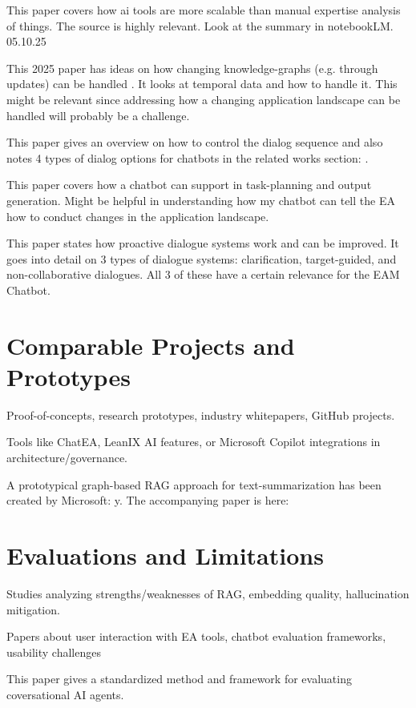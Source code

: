This paper covers how ai tools are more scalable than manual expertise analysis of things. The source is highly relevant. Look at the summary in notebookLM. 05.10.25 \cite{gu2024survey}

This 2025 paper has ideas on how changing knowledge-graphs (e.g. through updates) can be handled \cite{temporalGraphRag}. It looks at temporal data and how to handle it. This might be relevant since addressing how a changing application landscape can be handled will probably be a challenge.

This paper gives an overview on how to control the dialog sequence and also notes 4 types of dialog options for chatbots in the related works section: \cite{li2025chatsopsopguidedmctsplanning}.

This paper \cite{Zhai_2025} covers how a chatbot can support in task-planning and output generation. Might be helpful in understanding how my chatbot can tell the EA how to conduct changes in the application landscape.

This paper \cite{deng2023promptingevaluatinglargelanguage} states how proactive dialogue systems work and can be improved. It goes into detail on 3 types of dialogue systems: clarification, target-guided, and non-collaborative dialogues. All 3 of these have a certain relevance for the EAM Chatbot.

%
%
\section{Comparable Projects and Prototypes}
\label{sec:intro:prototypes}
Proof-of-concepts, research prototypes, industry whitepapers, GitHub projects.

Tools like ChatEA, LeanIX AI features, or Microsoft Copilot integrations in architecture/governance.

A prototypical graph-based RAG approach for text-summarization has been created by Microsoft: y\cite{MsGraphRAGPrototype}. The accompanying paper is here: \cite{MsGraphRAGPaper}

%
%
\section{Evaluations and Limitations}
\label{sec:intro:limitations}
Studies analyzing strengths/weaknesses of RAG, embedding quality, hallucination mitigation.

Papers about user interaction with EA tools, chatbot evaluation frameworks, usability challenges

This paper \cite{evaluationFrameworkLLMs} gives a standardized method and framework for evaluating coversational AI agents.









